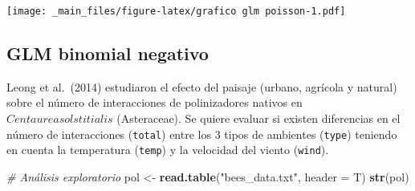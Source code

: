 \documentclass[
]{book}
\newenvironment{Shaded}{\begin{snugshade}}{\end{snugshade}}
\newcommand{\CommentTok}[1]{\textcolor[rgb]{0.56,0.35,0.01}{\textit{#1}}}
\newcommand{\DataTypeTok}[1]{\textcolor[rgb]{0.13,0.29,0.53}{#1}}
\newcommand{\KeywordTok}[1]{\textcolor[rgb]{0.13,0.29,0.53}{\textbf{#1}}}
\newcommand{\NormalTok}[1]{#1}
\newcommand{\StringTok}[1]{\textcolor[rgb]{0.31,0.60,0.02}{#1}}
\begin{document}
\texttt{[image: \_main\_files/figure-latex/grafico glm poisson-1.pdf]}

\hypertarget{glm-binomial-negativo}{%
\subsection{GLM binomial negativo}\label{glm-binomial-negativo}}

Leong et al.~(2014) estudiaron el efecto del paisaje (urbano, agrícola y natural) sobre el número de interacciones de polinizadores nativos en \(Centaurea solstitialis\) (Asteraceae). Se quiere evaluar si existen diferencias en el número de interacciones (\texttt{total}) entre los 3 tipos de ambientes (\texttt{type}) teniendo en cuenta la temperatura (\texttt{temp}) y la velocidad del viento (\texttt{wind}).

\begin{Shaded}
\begin{Highlighting}[]
\CommentTok{# Análisis exploratorio}
\NormalTok{pol <-}\StringTok{ }\KeywordTok{read.table}\NormalTok{(}\StringTok{"bees_data.txt"}\NormalTok{, }\DataTypeTok{header =}\NormalTok{ T) }
\KeywordTok{str}\NormalTok{(pol)}
\end{Highlighting}
\end{Shaded}
\end{document}
